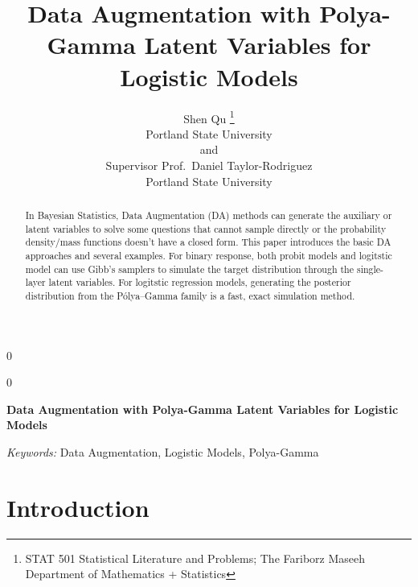 \documentclass[12pt]{article}
\newcommand{\blind}{0}
\begin{document}
\def\spacingset#1{\renewcommand{\baselinestretch}%
{#1}\small\normalsize} \spacingset{1}



\blind
{
  \title{\bf Data Augmentation with Polya-Gamma Latent Variables for
Logistic Models}

  \author{
        Shen Qu \thanks{STAT 501 Statistical Literature and Problems;
The Fariborz Maseeh Department of Mathematics + Statistics} \\
    Portland State University\\
     and \\     Supervisor Prof.~Daniel Taylor-Rodriguez \\
    Portland State University\\
      }
  \maketitle
} \fi

\blind
{
  \bigskip
  \bigskip
  \bigskip
  \begin{center}
    {\LARGE\bf Data Augmentation with Polya-Gamma Latent Variables for
Logistic Models}
  \end{center}
  \medskip
} \fi

\bigskip
\begin{abstract}
In Bayesian Statistics, Data Augmentation (DA) methods can generate the
auxiliary or latent variables to solve some questions that cannot sample
directly or the probability density/mass functions doesn't have a closed
form. This paper introduces the basic DA approaches and several
examples. For binary response, both probit models and logitstic model
can use Gibb's samplers to simulate the target distribution through the
single-layer latent variables. For logitstic regression models,
generating the posterior distribution from the Pólya--Gamma family is a
fast, exact simulation method.
\end{abstract}

\noindent%
{\it Keywords:} Data Augmentation, Logistic Models, Polya-Gamma
\vfill

\newpage
\spacingset{1.45} %

\hypertarget{introduction}{%
\section{Introduction}\label{introduction}}
\end{document}
